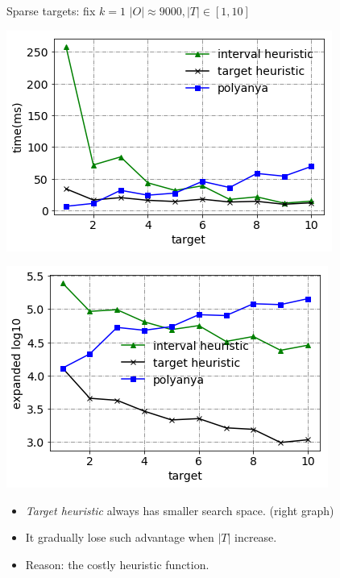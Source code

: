 \begin{frame}{Sparse targets: fix $k=1$}
\centering
\small{$|O| \approx 9000, |T| \in [1, 10]$}
\begin{minipage}{.5\textwidth}
    \begin{adjustbox}{max totalsize={.9\textwidth}{.9\textheight}, right}
    \centering
    \includegraphics{pic/e3_time.png}
    \end{adjustbox}
\end{minipage}%
\begin{minipage}{.5\textwidth}
    \begin{adjustbox}{max totalsize={.9\textwidth}{.9\textheight}, right}
    \centering
    \includegraphics{pic/e3_gen.png}
    \end{adjustbox}
\end{minipage}
\begin{itemize}
    \item \small{\textit{Target heuristic} always has smaller search space. (right graph)}
    \item \small{It gradually lose such advantage when $|T|$ increase.}
    \item \small{Reason: the costly heuristic function.}
\end{itemize}
\end{frame}

